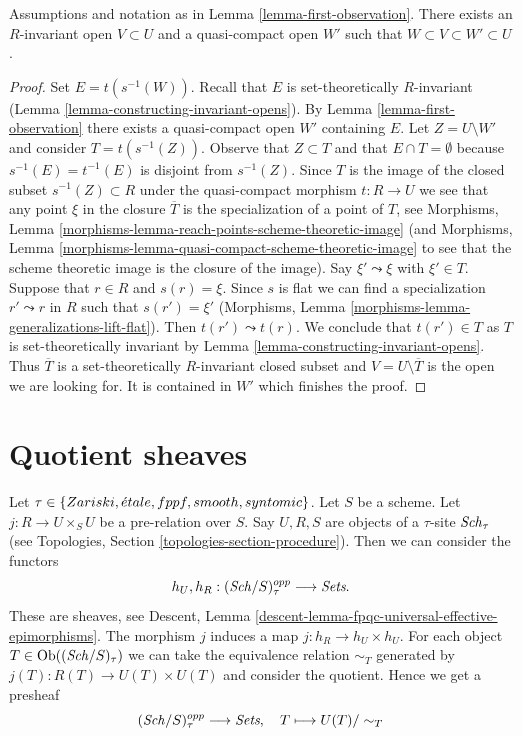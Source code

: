 \begin{lemma}
\label{lemma-second-observation}
Assumptions and notation as in Lemma \ref{lemma-first-observation}.
There exists an $R$-invariant open $V \subset U$ and a quasi-compact
open $W'$ such that $W \subset V \subset W' \subset U$.
\end{lemma}

\begin{proof}
Set $E = t(s^{-1}(W))$. Recall that $E$ is set-theoretically $R$-invariant
(Lemma \ref{lemma-constructing-invariant-opens}).
By Lemma \ref{lemma-first-observation} there exists a quasi-compact
open $W'$ containing $E$. Let $Z = U \setminus W'$ and consider
$T = t(s^{-1}(Z))$. Observe that $Z \subset T$ and that
$E \cap T = \emptyset$ because $s^{-1}(E) = t^{-1}(E)$ is disjoint
from $s^{-1}(Z)$. Since $T$ is the image of the closed subset
$s^{-1}(Z) \subset R$ under the quasi-compact morphism $t : R \to U$
we see that any point $\xi$ in the closure $\overline{T}$
is the specialization of a point of $T$, see
Morphisms, Lemma \ref{morphisms-lemma-reach-points-scheme-theoretic-image} (and
Morphisms, Lemma \ref{morphisms-lemma-quasi-compact-scheme-theoretic-image}
to see that the scheme theoretic image is the closure of the image).
Say $\xi' \leadsto \xi$ with $\xi' \in T$. Suppose that $r \in R$ and
$s(r) = \xi$. Since $s$ is flat we can find a specialization $r' \leadsto r$
in $R$ such that $s(r') = \xi'$
(Morphisms, Lemma \ref{morphisms-lemma-generalizations-lift-flat}).
Then $t(r') \leadsto t(r)$. We conclude that $t(r') \in T$ as $T$
is set-theoretically invariant by
Lemma \ref{lemma-constructing-invariant-opens}.
Thus $\overline{T}$ is a set-theoretically $R$-invariant closed subset
and $V = U \setminus \overline{T}$ is the open we are
looking for. It is contained in $W'$ which finishes the proof.
\end{proof}




\section{Quotient sheaves}
\label{section-quotient-sheaves}

\noindent
Let $\tau \in \{Zariski, {\acute{e}tale}, fppf, smooth, syntomic\}$.
Let $S$ be a scheme.
Let $j : R \to U \times_S U$ be a pre-relation over $S$.
Say $U, R, S$ are objects of a $\tau$-site $\mathit{Sch}_\tau$
(see Topologies, Section \ref{topologies-section-procedure}).
Then we can consider the functors
$$
h_U, h_R :
(\mathit{Sch}/S)_\tau^{opp}
\longrightarrow
\textit{Sets}.
$$
These are sheaves, see
Descent, Lemma \ref{descent-lemma-fpqc-universal-effective-epimorphisms}.
The morphism $j$ induces a map $j : h_R \to h_U \times h_U$.
For each object $T \in \mathop{\mathrm{Ob}}\nolimits((\mathit{Sch}/S)_\tau)$
we can take the equivalence relation $\sim_T$ generated by
$j(T) : R(T) \to U(T) \times U(T)$ and consider the quotient.
Hence we get a presheaf
\begin{equation}
\label{equation-quotient-presheaf}
(\mathit{Sch}/S)_\tau^{opp}
\longrightarrow
\textit{Sets}, \quad
T \longmapsto U(T)/\sim_T
\end{equation}

